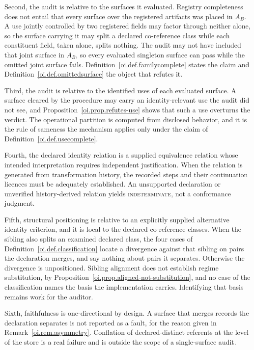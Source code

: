 \documentclass[11pt]{article}
\theoremstyle{plain}
\theoremstyle{definition}
\theoremstyle{remark}
\newcommand{\INDET}{\textnormal{\textsc{indeterminate}}}
\begin{document}
Second, the audit is relative to the surfaces it evaluated.
Registry completeness does not entail that every surface
over the registered artifacts was placed in \(A_B\).
A use jointly controlled by two registered fields may factor through neither alone,
so the surface carrying it may split a declared co-reference class
while each constituent field, taken alone, splits nothing.
The audit may not have included that joint surface in \(A_B\),
so every evaluated singleton surface can pass while the omitted joint surface fails.
Definition~\ref{oi.def.familycomplete} states the claim
and Definition~\ref{oi.def.omittedsurface} the object that refutes it.

Third, the audit is relative to the identified uses of each evaluated surface.
A surface cleared by the procedure
may carry an identity-relevant use the audit did not see,
and Proposition~\ref{oi.prop.refutes-use}
shows that such a use overturns the verdict.
The operational partition is computed from disclosed behavior,
and it is the rule of sameness the mechanism applies
only under the claim of Definition~\ref{oi.def.usecomplete}.

Fourth, the declared identity relation is a supplied
equivalence relation whose intended interpretation requires
independent justification.
When the relation is generated from transformation history,
the recorded steps and their continuation licences
must be adequately established.
An unsupported declaration or unverified history-derived
relation yields \INDET{}, not a conformance judgment.

Fifth, structural positioning is relative to an explicitly
supplied alternative identity criterion,
and it is local to the declared co-reference classes.
When the sibling also splits an examined declared class,
the four cases of Definition~\ref{oi.def.classification}
locate a divergence against that sibling
on pairs the declaration merges,
and say nothing about pairs it separates.
Otherwise the divergence is unpositioned.
Sibling alignment does not establish regime substitution,
by Proposition~\ref{oi.prop.aligned-not-substitution},
and no case of the classification names the basis
the implementation carries.
Identifying that basis remains work for the auditor.

Sixth, faithfulness is one-directional by design.
A surface that merges records the declaration separates
is not reported as a fault,
for the reason given in Remark~\ref{oi.rem.asymmetry}.
Conflation of declared-distinct referents at the level of the store
is a real failure and is outside the scope of a single-surface audit.
\end{document}
